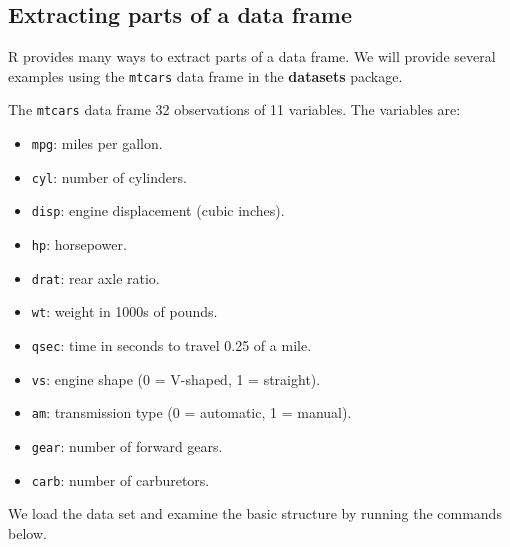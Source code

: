 \documentclass[
]{book}
\newenvironment{Shaded}{\begin{snugshade}}{\end{snugshade}}
\newcommand{\CommentTok}[1]{\textcolor[rgb]{0.56,0.35,0.01}{\textit{#1}}}
\newcommand{\DocumentationTok}[1]{\textcolor[rgb]{0.56,0.35,0.01}{\textbf{\textit{#1}}}}
\newcommand{\FunctionTok}[1]{\textcolor[rgb]{0.00,0.00,0.00}{#1}}
\newcommand{\NormalTok}[1]{#1}
\providecommand{\tightlist}{%
  \setlength{\itemsep}{0pt}\setlength{\parskip}{0pt}}
\theoremstyle{definition}
\theoremstyle{definition}
\theoremstyle{definition}
\theoremstyle{definition}
\theoremstyle{remark}
\begin{document}
\hypertarget{extracting-parts-of-a-data-frame}{%
\subsection{Extracting parts of a data frame}\label{extracting-parts-of-a-data-frame}}

R provides many ways to extract parts of a data frame. We will provide several examples using the \texttt{mtcars} data frame in the \textbf{datasets} package.

The \texttt{mtcars} data frame 32 observations of 11 variables. The variables are:

\begin{itemize}
\tightlist
\item
  \texttt{mpg}: miles per gallon.
\item
  \texttt{cyl}: number of cylinders.
\item
  \texttt{disp}: engine displacement (cubic inches).
\item
  \texttt{hp}: horsepower.
\item
  \texttt{drat}: rear axle ratio.
\item
  \texttt{wt}: weight in 1000s of pounds.
\item
  \texttt{qsec}: time in seconds to travel 0.25 of a mile.
\item
  \texttt{vs}: engine shape (0 = V-shaped, 1 = straight).
\item
  \texttt{am}: transmission type (0 = automatic, 1 = manual).
\item
  \texttt{gear}: number of forward gears.
\item
  \texttt{carb}: number of carburetors.
\end{itemize}

We load the data set and examine the basic structure by running the commands below.

\begin{Shaded}
\end{Shaded}
\end{document}
